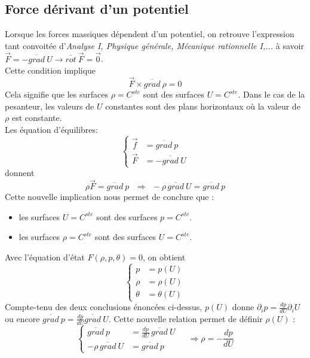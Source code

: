 	
	
	\subsection{Force dérivant d'un potentiel}
	Lorsque les forces massiques dépendent d'un potentiel, on retrouve l'expression tant
	convoitée d'\textit{Analyse I, Physique générale, Mécanique rationnelle I,...} à 
	savoir $\vec{F} = -\overline{grad}\ U \rightarrow \overline{rot}\ \vec{F} = \vec 0$.\\
	Cette condition implique 
	\begin{equation}
	\vec{F}\times \overline{grad}\ \rho = 0
	\end{equation}
	Cela signifie que les surfaces $\rho = C^{ste}$ sont des surfaces $U = C^{ste}$.
	Dans le cas de la pesanteur, les valeurs de $U$ constantes sont des plans horizontaux
	où la valeur de $\rho$ est constante.\\
	
	Les équation d'équilibres:
	\begin{equation}
	\left\{\begin{array}{ll}
	\vec{f} &= \overline{grad}\ p\\
	\vec{F} &= -\overline{grad}\ U
	\end{array}\right.
	\end{equation}
	donnent
	\begin{equation}
	\rho\vec{F} = \overline{grad}\ p\ \ \ \Rightarrow\ \ -\rho\,\overline{grad}\ U =
	\overline{grad}\ p
	\end{equation}
	Cette nouvelle implication nous permet de conclure que :
	\begin{itemize}
	\item les surfaces $U = C^{ste}$ sont des surfaces $p = C^{ste}$.
	\item les surfaces $\rho = C^{ste}$ sont des surfaces $U = C^{ste}$.
	\end{itemize}
	Avec l'équation d'état $F(\rho,p,\theta) = 0$, on obtient 
	\begin{equation}	
	\left\{\begin{array}{ll}
	p &= p(U)\\
	\rho &= \rho(U)\\
	\theta &= \theta(U)
	\end{array}\right.
	\end{equation}
	Compte-tenu des deux conclusions énoncées ci-dessus, $p(U)$ 
	donne $\partial_i p = \frac{dp}{dU}\partial_i U$ ou encore $\overline{grad}\ p = 
	\frac{dp}{dU}\overline{grad}\ U$. Cette nouvelle relation permet de définir $\rho(
	U)$ :
	\begin{equation}
	\left\{\begin{array}{ll}
	\overline{grad}\ p &= \frac{dp}{dU}\,\overline{grad}\ U\\
	-\rho\,\overline{grad}\ U &= 	\overline{grad}\ p
	\end{array}\right.\ \ \ \ \ \Rightarrow \rho = -\dfrac{dp}{dU}
	\end{equation}


